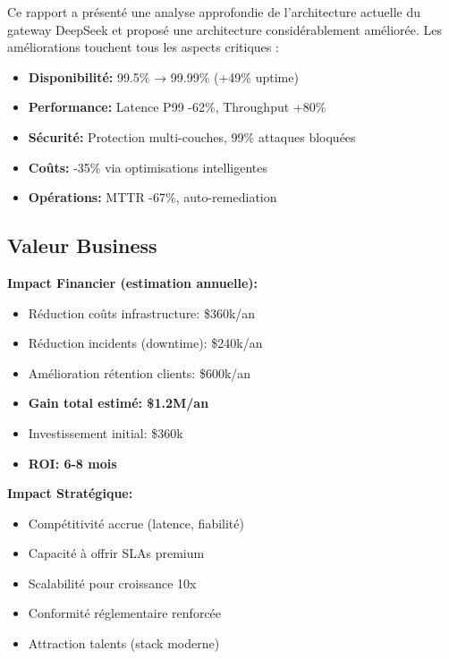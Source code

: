 \documentclass[12pt,a4paper]{article}
\begin{document}
Ce rapport a présenté une analyse approfondie de l'architecture actuelle du gateway DeepSeek et proposé une architecture considérablement améliorée. Les améliorations touchent tous les aspects critiques :

\begin{tcolorbox}[colback=blue!5,colframe=blue!50!black,title=\textbf{Résumé des Gains}]
\begin{itemize}[noitemsep]
    \item \textbf{Disponibilité:} 99.5\% → 99.99\% (+49\% uptime)
    \item \textbf{Performance:} Latence P99 -62\%, Throughput +80\%
    \item \textbf{Sécurité:} Protection multi-couches, 99\% attaques bloquées
    \item \textbf{Coûts:} -35\% via optimisations intelligentes
    \item \textbf{Opérations:} MTTR -67\%, auto-remediation
\end{itemize}
\end{tcolorbox}

\subsection{Valeur Business}

\textbf{Impact Financier (estimation annuelle):}
\begin{itemize}[noitemsep]
    \item Réduction coûts infrastructure: \$360k/an
    \item Réduction incidents (downtime): \$240k/an
    \item Amélioration rétention clients: \$600k/an
    \item \textbf{Gain total estimé: \$1.2M/an}
    \item Investissement initial: \$360k
    \item \textbf{ROI: 6-8 mois}
\end{itemize}

\textbf{Impact Stratégique:}
\begin{itemize}[noitemsep]
    \item Compétitivité accrue (latence, fiabilité)
    \item Capacité à offrir SLAs premium
    \item Scalabilité pour croissance 10x
    \item Conformité réglementaire renforcée
    \item Attraction talents (stack moderne)
\end{itemize}
\end{document}
